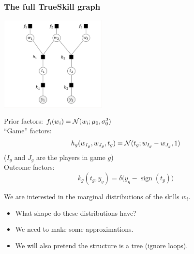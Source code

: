 \begin{frame}
\frametitle{The full TrueSkill graph}

\parbox{0.4\textwidth}{
\includegraphics[trim=3cm 0cm 1cm 0cm, clip=true, width=0.4\textwidth]{TrueSkillFullEP1}
}
\parbox{0.59\textwidth}{
Prior factors: $f_i(w_i)=\mathcal{N}(w_i; \mu_0, \sigma_0^2)$\\

``Game'' factors: 
\[
h_g(w_{I_g},w_{J_g},t_g)=\mathcal{N}(t_g; w_{I_g}-w_{J_g},1)
\]
\hfill($I_g$ and $J_g$ are the players in game $g$)\\

Outcome factors:
\[
k_g(t_g, y_g) = \delta\big(y_g - \operatorname{sign}(t_g)\big)
\]

}

We are interested in the marginal distributions of the skills $w_i$.
\begin{itemize}
\item What shape do these distributions have?
\item We need to make some approximations.
\item We will also pretend the structure is a tree (ignore loops).
\end{itemize}

\end{frame}


